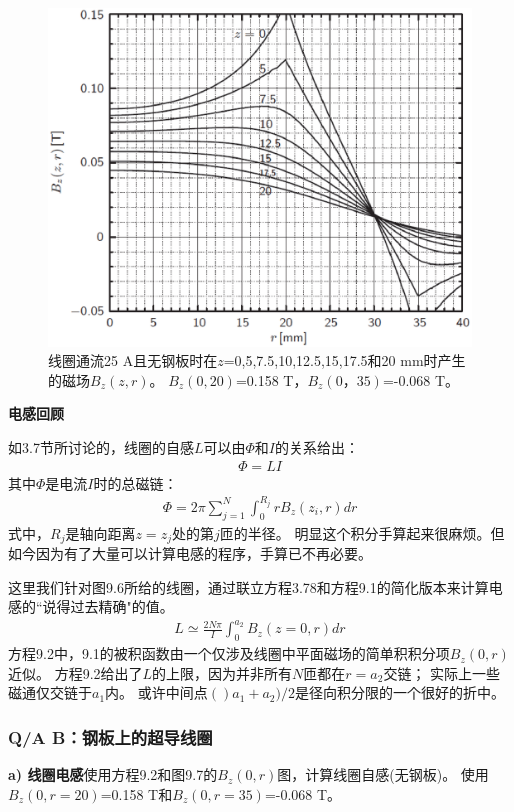 \begin{figure}
	\centering
	\includegraphics[scale=0.5]{chpt9/figs/fig9.7.eps}
	\caption{线圈通流25 A且无钢板时在$z$=0,5,7.5,10,12.5,15,17.5和20 mm时产生的磁场$B_z(z,r)$。
		$B_z(0,20)$=0.158 T，$B_z(0，35)$=-0.068 T。}
\end{figure}

\textbf{电感回顾}

如3.7节所讨论的，线圈的自感$L$可以由$\Phi$和$I$的关系给出：
\begin{align*}%
\Phi=LI \tag{3.78}
\end{align*}
其中$\Phi$是电流$I$时的总磁链：
\begin{align*}%
\Phi=2\pi\sum_{j=1}^{N}\int_{0}^{R_j}rB_z(z_i,r)dr \tag{9.1}
\end{align*}
式中，$R_j$是轴向距离$z=z_j$处的第$j$匝的半径。
明显这个积分手算起来很麻烦。但如今因为有了大量可以计算电感的程序，手算已不再必要。

这里我们针对图9.6所给的线圈，通过联立方程3.78和方程9.1的简化版本来计算电感的``说得过去精确"的值。
\begin{align*}%
L\simeq\frac{2N\pi}{I}\int_{0}^{a_2}B_z(z=0,r)dr \tag{9.2}
\end{align*}
方程9.2中，9.1的被积函数由一个仅涉及线圈中平面磁场的简单积积分项$B_z(0,r)$近似。
方程9.2给出了$L$的上限，因为并非所有$N$匝都在$r=a_2$交链；
实际上一些磁通仅交链于$a_1$内。
或许中间点$()a_1+a_2)/2$是径向积分限的一个很好的折中。


\subsubsection{Q/A B：钢板上的超导线圈}
\textbf{a) 线圈电感}\qquad 使用方程9.2和图9.7的$B_z(0,r)$图，计算线圈自感(无钢板)。
使用$B_z(0,r=20)$=0.158 T和$B_z(0,r=35)$=-0.068 T。

